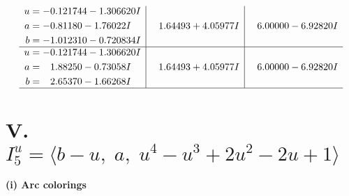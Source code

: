\documentclass[1p]{elsarticle_modified}
\theoremstyle{definition}
\begin{document}
$$\begin{array}{c|c|c}
\begin{aligned}
u &= -0.121744 - 1.306620 I \\
a &= -0.81180 - 1.76022 I \\
b &= -1.012310 - 0.720834 I\end{aligned}
 & \phantom{-}1.64493 + 4.05977 I & \phantom{-}6.00000 - 6.92820 I \\ \hline\begin{aligned}
u &= -0.121744 - 1.306620 I \\
a &= \phantom{-}1.88250 - 0.73058 I \\
b &= \phantom{-}2.65370 - 1.66268 I\end{aligned}
 & \phantom{-}1.64493 + 4.05977 I & \phantom{-}6.00000 - 6.92820 I\\
 \hline 
 \end{array}$$\newpage\newpage\renewcommand{\arraystretch}{1}
\centering \section*{V. $I^u_{5}= \langle b- u,\;a,\;u^4- u^3+2 u^2-2 u+1 \rangle$}
\flushleft \textbf{(i) Arc colorings}\\
\end{document}
